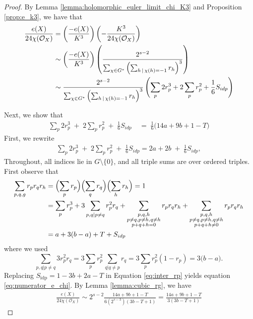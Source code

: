 \documentclass[12pt,twoside,]{amsart}
\theoremstyle{plain}
\theoremstyle{definition}
\begin{document}
\begin{proof}
By Lemma \ref{lemma:holomorphic_euler_limit_chi_K3} and Proposition \ref{prop:e_k3},  we have that 
\begin{align}
  \frac{e(X)}{24\chi(\mathcal{O}_X)}
&=\left( \frac{-e(X)}{K^3}\right)
\left( - \frac{K^3}{24\chi(\mathcal{O}_X)}
\right)
\notag
\\
& \sim \left( \frac{-e(X)}{K^3}\right)
\left( \frac{2^{s-2}}{\sum_{\chi \in G^*} 
  \left( 
  \sum_{h \, | \, \chi(h) =-1}   
  r_h
  \right)^3 }
\right)
\notag
\\
& \sim 
\frac{2^{s-2}}{\sum_{\chi \in G^*} 
  \left( 
  \sum_{h \, | \, \chi(h) =-1}   
  r_h
  \right)^3 } 
\left(
\sum_{p}2r_p^3 
+
2\sum_p r_p^2 
+
\frac{1}{6}
S_{idp}
\right)
\end{align}

Next, we show that 
\begin{align}\label{eq:numerator_e_chi}
\sum_{p} 2 r_p^3
\;+\; 2\sum_{p} r_p^2
\;+\; \frac{1}{6}
S_{idp}
\;&=\;
\frac{1}{6}\bigl(14a + 9b + 1 - T\bigr)
\end{align}
First, we rewrite
\begin{align}\label{eq:inter_rp}
\sum_p 2r_p^3
  \;+\; 2\sum_p r_p^2
  \;+\; \frac{1}{6} S_{idp}
= 2a + 2b \;+\; \frac{1}{6} S_{idp}, 
\end{align}
Throughout, all indices lie in 
$G\setminus\{0\}$, and all triple sums are over ordered triples. First observe that
\begin{align*}
\sum_{p,q,g} r_p r_q r_h
&= \Bigl(\sum_{p} r_p\Bigr)
  \Bigl(\sum_{q} r_q\Bigr)
  \Bigl(\sum_{h} r_h\Bigr)
= 1
\\
&=
\sum_{p} r_p^3 
+ 3\sum_{p, q | p \neq q} r_p^2r_q 
+  \sum_{\substack{p,q,h\\
                    p \neq q, p \neq h,q \neq h \\
                  p+q+h = 0
                   }}r_p r_q r_h
+
   \sum_{\substack{p,q,h\\
                    p \neq q, p \neq h,q \neq h \\
                  p+q+h \neq 0
                   }}r_p r_q r_h  
\\
&= a + 3(b-a) + T + S_{idp}
\end{align*}
where we used
\[ 
\sum_{p,q | p\ne q} 3 r_p^2 r_q
= 3\sum_p r_p^2\!\! \, \sum_{q | q\ne p} r_q
= 3\sum_p r_p^2(1 - r_p)
= 3\bigl(b - a\bigr).
\]
Replacing
\(
S_{\mathrm{idp}}
=
1 - 3b + 2a - T
\)
in Equation \eqref{eq:inter_rp} yields equation \eqref{eq:numerator_e_chi}. By Lemma \ref{lemma:cubic_rg}, we have
\begin{align*}
\frac{e(X)}{24\chi(\mathcal{O}_X)}
\sim
2^{s-2}
\frac{14a+9b+1-T}{6(2^{s-3})(3b-T+1)}
=
\frac{14a+9b+1-T}{3(3b-T+1)}
\end{align*}
\end{proof}
\end{document}
